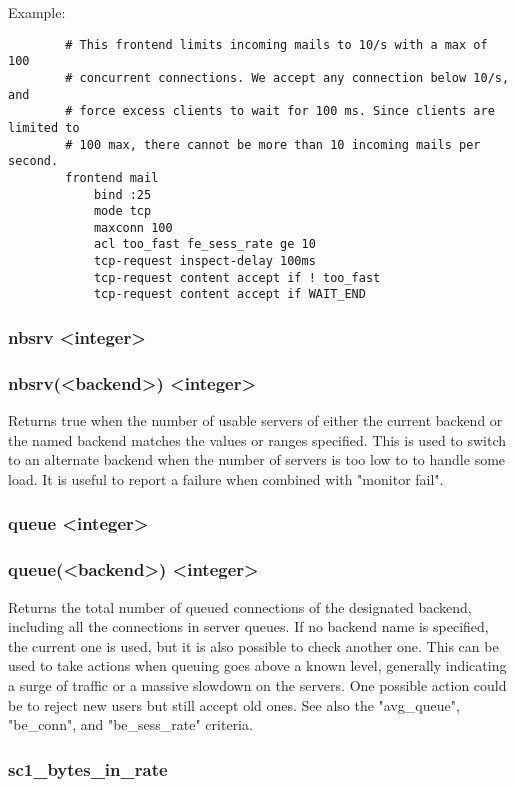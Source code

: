   Example:
  \begin{verbatim}
        # This frontend limits incoming mails to 10/s with a max of 100
        # concurrent connections. We accept any connection below 10/s, and
        # force excess clients to wait for 100 ms. Since clients are limited to
        # 100 max, there cannot be more than 10 incoming mails per second.
        frontend mail
            bind :25
            mode tcp
            maxconn 100
            acl too_fast fe_sess_rate ge 10
            tcp-request inspect-delay 100ms
            tcp-request content accept if ! too_fast
            tcp-request content accept if WAIT_END
  \end{verbatim}

\subsubsection[nbsrv]{nbsrv <integer>}
\subsubsection*{nbsrv(<backend>) <integer>}
  Returns true when the number of usable servers of either the current backend
  or the named backend matches the values or ranges specified. This is used to
  switch to an alternate backend when the number of servers is too low to
  to handle some load. It is useful to report a failure when combined with
  "monitor fail".

\subsubsection[queue]{queue <integer>}
\subsubsection*{queue(<backend>) <integer>}
  Returns the total number of queued connections of the designated backend,
  including all the connections in server queues. If no backend name is
  specified, the current one is used, but it is also possible to check another
  one. This can be used to take actions when queuing goes above a known level,
  generally indicating a surge of traffic or a massive slowdown on the servers.
  One possible action could be to reject new users but still accept old ones.
  See also the "avg\_queue", "be\_conn", and "be\_sess\_rate" criteria.

\subsubsection{sc1\_bytes\_in\_rate}
